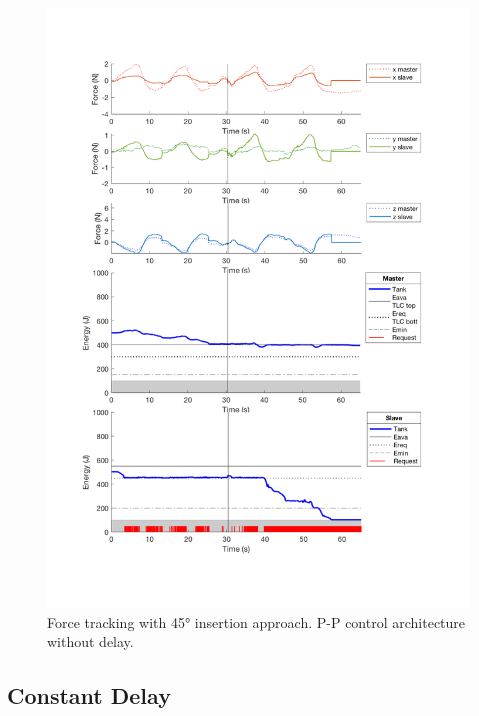 \begin{center}
	\begin{figure}
		\includegraphics[width=\textwidth, keepaspectratio]{plots/pp45/Force.pdf}
		\caption{Force tracking with 45° insertion approach. P-P control architecture without delay.}
		\label{graph:pp45/Force}
	\end{figure}
\end{center}
\newpage
\subsection{Constant Delay}

